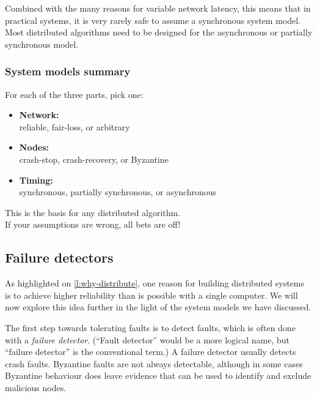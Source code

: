 Combined with the many reasons for variable network latency, this means that in practical systems, it is very rarely safe to assume a synchronous system model.
Most distributed algorithms need to be designed for the asynchronous or partially synchronous model.

\begin{frame}
    \label{s:model-summary}
    \frametitle{System models summary}
    For each of the three parts, pick one:\\
    \begin{itemize}
        \item \textbf{Network:}\\
            reliable, fair-loss, or arbitrary\\[1em]
        \item \textbf{Nodes:}\\
            crash-stop, crash-recovery, or Byzantine\\[1em]
        \item \textbf{Timing:}\\
            synchronous, partially synchronous, or asynchronous\\[1em]
    \end{itemize}
    This is the basis for any distributed algorithm.\\
    If your assumptions are wrong, all bets are off!
\end{frame}
\label{l:model-summary}

\subsection{Failure detectors}\label{sec:failure-detectors}

As highlighted on \autoref{l:why-distribute}, one reason for building distributed systems is to achieve higher reliability than is possible with a single computer.
We will now explore this idea further in the light of the system models we have discussed.

The first step towards tolerating faults is to detect faults, which is often done with a \emph{failure detector}.
(``Fault detector'' would be a more logical name, but ``failure detector'' is the conventional term.)
A failure detector usually detects crash faults.
Byzantine faults are not always detectable, although in some cases Byzantine behaviour does leave evidence that can be used to identify and exclude malicious nodes.

